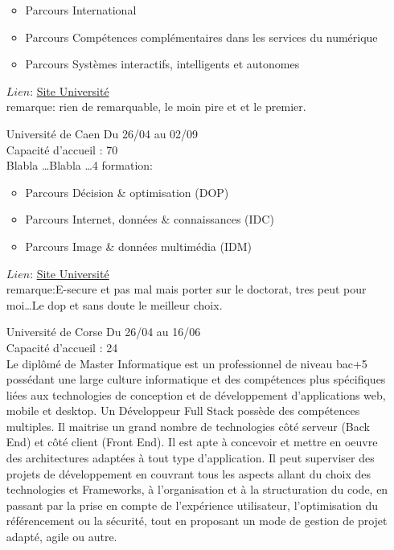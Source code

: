 \documentclass[a4paper,11pt]{article}
\begin{document}
\begin{enumerate}
\begin{itemize}
                    \item Parcours International
                    \item Parcours Compétences complémentaires dans les services du numérique
                    \item Parcours Systèmes interactifs, intelligents et autonomes
                \end{itemize}
                $Lien$: \href{http://formations.univ-brest.fr/fr/index/sciences-technologies-sante-STS/master-XB/master-informatique-INRBV8Y3//parcours-ingenierie-du-logiciel-applications-aux-donnees-environnementales-INRBV93V.html}{Site Université}
                \\ remarque: rien de remarquable, le moin pire et et le premier.
\\
        \item [\color{LightOrangeHaf}Université de Caen] Du 26/04 au 02/09
                \\Capacité d'accueil : 70
                \\Blabla \ldots Blabla \dots 4 formation:
                \begin{itemize}
                    \item Parcours Décision \& optimisation (DOP)
                    \item Parcours Internet, données \& connaissances (IDC)
                    \item Parcours Image \& données multimédia (IDM)
                \end{itemize}
                $Lien$: \href{https://uniform.unicaen.fr/catalogue/index?mot-cle=info&composante=&type=M&domaine=STS&modalite=&fi=0&fc-hcp=0&contrat-pro=0&fa=0&s=trouver-sa-formation&r=&submit=Rechercher}{Site Université}
                \\ remarque:E-secure et pas mal mais porter sur le doctorat, tres peut pour moi\ldots Le dop et sans doute le meilleur choix.
\\
        \item [\color{LightOrangeHaf}Université de Corse] Du 26/04 au 16/06
                \\Capacité d'accueil : 24
                \\Le diplômé de Master Informatique est un professionnel de niveau bac+5 possédant une large culture informatique et des compétences plus spécifiques liées aux technologies de conception et de développement d'applications web, mobile et desktop. Un Développeur Full Stack possède des compétences multiples. Il maitrise un grand nombre de technologies côté serveur (Back End) et côté client (Front End). Il est apte à concevoir et mettre en oeuvre des architectures adaptées à tout type d'application. Il peut superviser des projets de développement en couvrant tous les aspects allant du choix des technologies et Frameworks, à l'organisation et à la structuration du code, en passant par la prise en compte de l'expérience utilisateur, l'optimisation du référencement ou la sécurité, tout en proposant un mode de gestion de projet adapté, agile ou autre. 

\end{enumerate}
\end{document}
